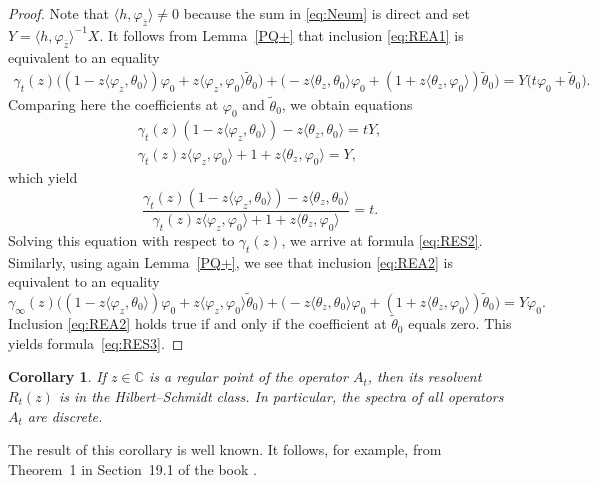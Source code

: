 \documentclass[10pt,a4paper]{amsart}
\numberwithin{equation}{section}
\newtheorem{Corollary}[Theorem]{Corollary}
\begin{document}
\begin{proof}
 Note that $\langle h, \varphi_{\bar{z}}\rangle\neq 0$ because the sum in \eqref{eq:Neum} is direct and set
 $Y= \langle h, \varphi_{\bar{z}}\rangle^{-1}X$.
 It follows from Lemma~\ref{PQ+} that
 inclusion \eqref{eq:REA1} is equivalent to an equality
 \begin{gather*}
 \!\gamma_{t} (z) \big( ( 1-z \langle \varphi_{z}, \theta_{0}\rangle ) \varphi_{0} +z \langle \varphi_{z}, \varphi_{0}\rangle \tilde{\theta}_{0}\big)
 + \big({-} z \langle \theta_{z}, \theta_{0} \rangle \varphi_{0} + ( 1+ z \langle \theta_{z}, \varphi_{0}\rangle ) \tilde{\theta}_{0} \big) = Y \big(t \varphi_{0} + \tilde{\theta}_{0}\big) .
 \end{gather*}
 Comparing here the coefficients at $\varphi_{0}$ and $ \tilde{\theta}_{0}$, we obtain equations
 \begin{gather*}
 \gamma_{t} (z) ( 1-z \langle \varphi_{z}, \theta_{0}\rangle )- z \langle \theta_{z}, \theta_{0}\rangle =t Y,
 \\
 \gamma_{t} (z) z \langle \varphi_{z}, \varphi_{0}\rangle + 1+ z \langle \theta_{z}, \varphi_{0}\rangle=Y,
 \end{gather*}
 which yield
 \[
 \frac{ \gamma_{t} (z) ( 1-z \langle \varphi_{z}, \theta_{0}\rangle )- z \langle \theta_{z}, \theta_{0}\rangle }
 {\gamma_{t} (z) z \langle \varphi_{z}, \varphi_{0}\rangle + 1+ z \langle \theta_{z}, \varphi_{0}\rangle } =t.
 \]
 Solving this equation with respect to $\gamma_{t} (z) $, we arrive at formula \eqref{eq:RES2}.
 Similarly, using again Lemma~\ref{PQ+}, we see that
 inclusion \eqref{eq:REA2} is equivalent to an equality
 \[
 \gamma_\infty (z) \big(( 1-z \langle \varphi_{z}, \theta_{0}\rangle ) \varphi_{0} + z \langle \varphi_{z}, \varphi_{0}\rangle \tilde{\theta}_{0} \big)
 + \big({-} z \langle \theta_{z}, \theta_{0} \rangle \varphi_{0} + ( 1+ z \langle \theta_{z}, \varphi_{0}\rangle ) \tilde{\theta}_{0} \big) = Y \varphi_{0} .
 \]
Inclusion \eqref{eq:REA2} holds true if and only if the coefficient at $\tilde{\theta}_{0} $ equals zero. This yields formula~\eqref{eq:RES3}.
\end{proof}

 \begin{Corollary}\label{RESb}
 If $z\in {\mathbb C}$ is a regular point of the operator $A_{t}$, then its resolvent~$R_{t} (z)$ is in the Hilbert--Schmidt class.
 In particular, the spectra of all operators~$A_{t}$ are discrete.
 \end{Corollary}

The result of this corollary is well known. It follows, for example, from Theorem~1 in Section~19.1 of the book \cite{Nai}.
\end{document}
